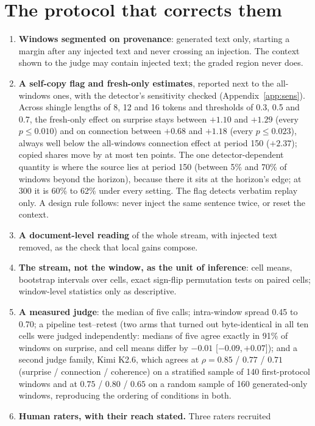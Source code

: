 \documentclass[11pt]{article}
\newcommand{\ci}[2]{[$#1$,\,$#2$]}
\begin{document}
\section{The protocol that corrects them}

\begin{enumerate}[leftmargin=1.5em,itemsep=0.15em]
\item \textbf{Windows segmented on provenance}: generated text only,
starting a margin after any injected text and never crossing an injection.
The context shown to the judge may contain injected text; the graded region
never does.
\item \textbf{A self-copy flag and fresh-only estimates}, reported next to
the all-windows ones, with the detector's sensitivity checked
(Appendix~\ref{app:sens}). Across shingle lengths of 8, 12 and 16 tokens and
thresholds of 0.3, 0.5 and 0.7, the fresh-only effect on surprise stays
between $+1.10$ and $+1.29$ (every $p\le0.010$) and on connection between
$+0.68$ and $+1.18$ (every $p\le0.023$), always well below the all-windows
connection effect at period 150 ($+2.37$); copied shares move by at most ten
points. The one detector-dependent quantity is where the source lies at
period 150 (between 5\% and 70\% of windows beyond the horizon), because there
it sits at the horizon's edge; at 300 it is 60\% to 62\% under every setting.
The flag detects verbatim replay only. A design rule follows: never inject
the same sentence twice, or reset the context.
\item \textbf{A document-level reading} of the whole stream, with injected
text removed, as the check that local gains compose.
\item \textbf{The stream, not the window, as the unit of inference}: cell
means, bootstrap intervals over cells, exact sign-flip permutation tests on
paired cells; window-level statistics only as descriptive.
\item \textbf{A measured judge}: the median of five calls; intra-window
spread 0.45 to 0.70; a pipeline test--retest (two arms that turned out
byte-identical in all ten cells were judged independently: medians of five
agree exactly in 91\% of windows on surprise, and cell means differ by
$-0.01$ \ci{-0.09}{+0.07}); and a second judge family, Kimi K2.6, which
agrees at $\rho=0.85$ / $0.77$ / $0.71$ (surprise / connection / coherence)
on a stratified sample of 140 first-protocol windows and at $0.75$ / $0.80$ /
$0.65$ on a random sample of 160 generated-only windows, reproducing the
ordering of conditions in both.
\item \textbf{Human raters, with their reach stated.} Three raters recruited

\end{enumerate}
\end{document}
